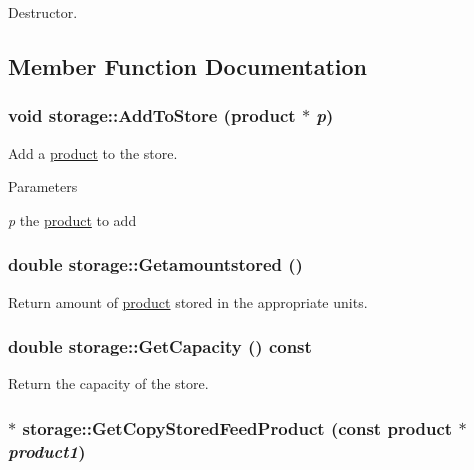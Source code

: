 Destructor. 

\subsection{Member Function Documentation}
\hypertarget{classstorage_aafe056e4218e1e93461e8d165dcb13ca}{
\subsubsection[{AddToStore}]{\setlength{\rightskip}{0pt plus 5cm}void storage::AddToStore ({\bf product} $\ast$ {\em p})}}
\label{classstorage_aafe056e4218e1e93461e8d165dcb13ca}


Add a \hyperlink{classproduct}{product} to the store. 
\begin{DoxyParams}{Parameters}
\item[{\em p}]the \hyperlink{classproduct}{product} to add \end{DoxyParams}
\hypertarget{classstorage_ac5395de0a763ca3db522336339cd6dfb}{
\subsubsection[{Getamountstored}]{\setlength{\rightskip}{0pt plus 5cm}double storage::Getamountstored ()}}
\label{classstorage_ac5395de0a763ca3db522336339cd6dfb}


Return amount of \hyperlink{classproduct}{product} stored in the appropriate units. \hypertarget{classstorage_ac6d321e217929cd9906adee777822dea}{
\subsubsection[{GetCapacity}]{\setlength{\rightskip}{0pt plus 5cm}double storage::GetCapacity () const}}
\label{classstorage_ac6d321e217929cd9906adee777822dea}


Return the capacity of the store. \hypertarget{classstorage_a1996eaa0b59046ab66d5be1713f90034}{
\subsubsection[{GetCopyStoredFeedProduct}]{ $\ast$ storage::GetCopyStoredFeedProduct (const {\bf product} $\ast$ {\em product1})}}
\label{classstorage_a1996eaa0b59046ab66d5be1713f90034}


